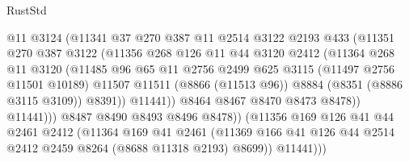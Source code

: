 \begin{lexlean}{RustStd}
\begin{coremodule}
{\begin{coremodule}
{{{{{{{{{{{{{{{{{{{{{{{{{{{{{{{{{{{{{{{{{{{{{{{{{{                              @11
                              @3124
                              (@11341
                                @37
                                @270
                                @387
                                @11
                                @2514
                                @3122
                                @2193
                                @433
                                (@11351
                                  @270
                                  @387
                                  @3122
                                  (@11356
                                    @268
                                    @126
                                    @11
                                    @44
                                    @3120
                                    @2412
                                    (@11364
                                      @268
                                      @11
                                      @3120
                                      (@11485
                                        @96
                                        @65
                                        @11
                                        @2756
                                        @2499
                                        @625
                                        @3115
                                        (@11497 @2756 @11501 @10189)
                                        @11507
                                        @11511
                                        (@8866 (@11513 @96))
                                        @8884
                                        (@8351 (@8886 @3115 @3109))
                                        @8391))
                                    @11441))
                                @8464
                                @8467
                                @8470
                                @8473
                                @8478))
                            @11441)))
                      @8487
                      @8490
                      @8493
                      @8496
                      @8478))
                  (@11356
                    @169
                    @126
                    @41
                    @44
                    @2461
                    @2412
                    (@11364
                      @169
                      @41
                      @2461
                      (@11369 @166 @41 @126 @44 @2514 @2412 @2459 @8264 (@8688 @11318 @2193) @8699))
                    @11441)))
}}}}}}}}}}}}}}}}}}}}}}}}}}}}}}}}}}}}}}}}}}}}}}}}}}
\end{coremodule}}
\end{coremodule}
\end{lexlean}
